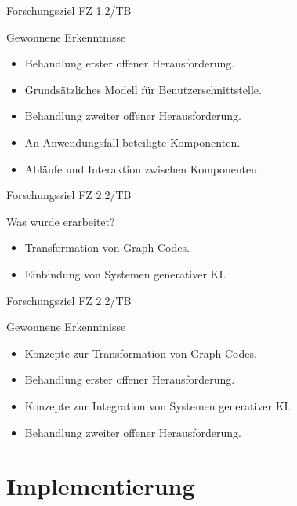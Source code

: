 \documentclass[t]{beamer}
\begin{document}
\begin{frame}{Forschungsziel FZ 1.2/TB}
  \begin{block}{Gewonnene Erkenntnisse}
    \begin{itemize}
      \item<+-> Behandlung erster offener Herausforderung.
      \item<+-> Grundsätzliches Modell für Benutzerschnittstelle.
      \item<+-> Behandlung zweiter offener Herausforderung.
      \item<+-> An Anwendungsfall beteiligte Komponenten.
      \item<+-> Abläufe und Interaktion zwischen Komponenten.
    \end{itemize}
  \end{block}
\end{frame}


\begin{frame}{Forschungsziel FZ 2.2/TB}
  \begin{block}{Was wurde erarbeitet?}
    \begin{itemize}
      \item<+-> Transformation von Graph Codes.
      \item<+-> Einbindung von Systemen generativer KI.
    \end{itemize}
  \end{block}
\end{frame}

\begin{frame}{Forschungsziel FZ 2.2/TB}
  \begin{block}{Gewonnene Erkenntnisse}
    \begin{itemize}
      \item<+-> Konzepte zur Transformation von Graph Codes.
      \item<+-> Behandlung erster offener Herausforderung.
      \item<+-> Konzepte zur Integration von Systemen generativer KI.
      \item<+-> Behandlung zweiter offener Herausforderung.
    \end{itemize}
  \end{block}
\end{frame}

\section{Implementierung}
\end{document}
